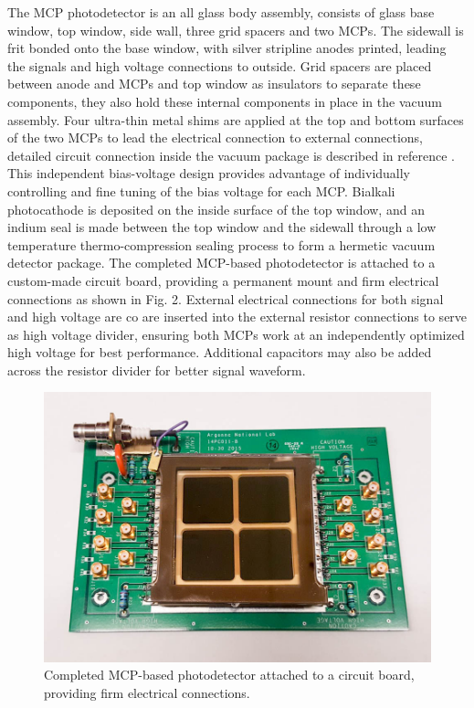 \documentclass[preprint,5p]{elsarticle}
\begin{document}
The MCP photodetector is an all glass body assembly, consists of glass base window, top window, side wall, three grid spacers and two MCPs. The sidewall is frit bonded onto the base window, with silver stripline anodes printed, leading the signals and high voltage connections to outside. Grid spacers are placed between anode and MCPs and top window as insulators to separate these components, they also hold these internal components in place in the vacuum assembly. Four ultra-thin metal shims are applied at the top and bottom surfaces of the two MCPs to lead the electrical connection to external connections, detailed circuit connection inside the vacuum package is described in reference \cite{Xia-MCPs}. This independent bias-voltage design provides advantage of individually controlling and fine tuning of the bias voltage for each MCP. Bialkali photocathode is deposited on the inside surface of the top window, and an indium seal is made between the top window and the sidewall through a low temperature thermo-compression sealing process to form a hermetic vacuum detector package. The completed MCP-based photodetector is attached to a custom-made circuit board, providing a permanent mount and firm electrical connections as shown in Fig. 2. External electrical connections for both signal and high voltage are co are inserted into the external resistor connections to serve as high voltage divider, ensuring both MCPs work at an independently optimized high voltage for best performance. Additional capacitors may also be added across the resistor divider for better signal waveform.  

\begin{figure}[tbp]
\centering 
\includegraphics[scale=0.23]{fig/MCPs_assembly.png}
\caption{Completed MCP-based photodetector attached to a circuit board, providing firm electrical connections.} 
\label{fig:MCP_assm}
\end{figure}
\end{document}

